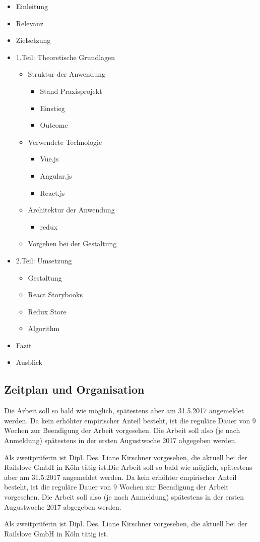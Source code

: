 \begin{itemize}
  \item Einleitung
  \item Relevanz
  \item Zielsetzung
  \item 1.Teil: Theoretische Grundlagen
  \begin{itemize}
    \item Struktur der Anwendung
    \begin{itemize}
      \item Stand Praxisprojekt
      \item Einstieg
      \item Outcome
    \end{itemize}
    \item Verwendete Technologie
    \begin{itemize}
      \item Vue.js
      \item Angular.js
      \item React.js
    \end{itemize}
    \item Architektur der Anwendung
    \begin{itemize}
      \item redux
    \end{itemize}
    \item Vorgehen bei der Gestaltung
  \end{itemize}
  \item 2.Teil: Umsetzung
  \begin{itemize}
    \item Gestaltung
    \item React Storybooks
    \item Redux Store
    \item Algorithm
  \end{itemize}
  \item Fazit
  \item Ausblick
\end{itemize}

\subsection{Zeitplan und Organisation}
Die Arbeit soll so bald wie möglich, spätestens aber am 31.5.2017 angemeldet werden. Da kein erhöhter empirischer Anteil besteht, ist die reguläre Dauer von 9 Wochen zur Beendigung der Arbeit vorgesehen. Die Arbeit soll also (je nach Anmeldung) spätestens in der ersten Augustwoche 2017 abgegeben werden.

Als zweitprüferin ist Dipl. Des. Liane Kirschner vorgesehen, die aktuell bei der Railslove GmbH in Köln tätig ist.Die Arbeit soll so bald wie möglich, spätestens aber am 31.5.2017 angemeldet werden. Da kein erhöhter empirischer Anteil besteht, ist die reguläre Dauer von 9 Wochen zur Beendigung der Arbeit vorgesehen. Die Arbeit soll also (je nach Anmeldung) spätestens in der ersten Augustwoche 2017 abgegeben werden.

Als zweitprüferin ist Dipl. Des. Liane Kirschner vorgesehen, die aktuell bei der Railslove GmbH in Köln tätig ist.
